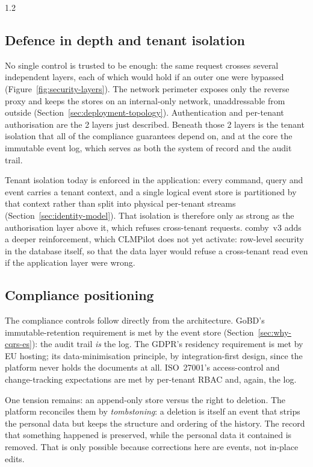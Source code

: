 \begin{spacing}{1.2}
\subsection{Defence in depth and tenant isolation}
\label{sec:defense-in-depth}

No single control is trusted to be enough: the same request crosses several
independent layers, each of which would hold if an outer one were bypassed
(Figure~\ref{fig:security-layers}). The network perimeter exposes only the
reverse proxy and keeps the stores on an internal-only network, unaddressable
from outside (Section~\ref{sec:deployment-topology}). Authentication and
per-tenant authorisation are the 2 layers just described. Beneath those 2
layers is the tenant isolation that all of the compliance guarantees depend on,
and at the core the immutable event log, which serves as both the system of
record and the audit trail.

\vspace{1cm}

Tenant isolation today is enforced in the application: every command, query
and event carries a tenant context, and a single logical event store is
partitioned by that context rather than split into physical per-tenant streams
(Section~\ref{sec:identity-model}). That isolation is therefore only as strong
as the authorisation layer above it, which refuses cross-tenant requests.
comby~v3 adds a deeper reinforcement, which CLMPilot does not yet activate: row-level security in the database
itself, so that the data layer would refuse a cross-tenant read even if the
application layer were wrong.

\subsection{Compliance positioning}
\label{sec:compliance-positioning}

The compliance controls follow directly from the architecture. GoBD's
immutable-retention requirement is met by the event store
(Section~\ref{sec:why-cqrs-es}): the audit trail \emph{is} the log. The
GDPR's residency requirement is met by EU hosting; its data-minimisation
principle, by integration-first design, since the platform never holds the
documents at all. ISO~27001's access-control and change-tracking
expectations are met by per-tenant RBAC and, again, the log.

One tension remains: an append-only store versus the right to
deletion. The platform reconciles them by \textit{tombstoning}: a deletion
is itself an event that strips the personal data but keeps the structure and
ordering of the history. The record that something happened is preserved,
while the personal data it contained is removed. That is only possible because
corrections here are events, not in-place edits.


\end{spacing}
